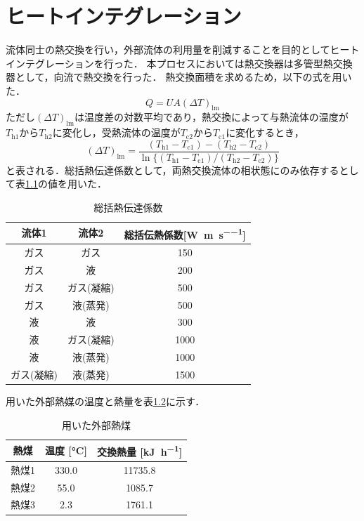 \documentclass[a4j]{jsreport}
\begin{document}
\clearpage
\chapter{ヒートインテグレーション}
流体同士の熱交換を行い，外部流体の利用量を削減することを目的としてヒートインテグレーションを行った．
本プロセスにおいては熱交換器は多管型熱交換器として，向流で熱交換を行った．
熱交換面積を求めるため，以下の式を用いた．
\begin{equation}
    Q=UA(\varDelta T)_\mathrm{lm}
\end{equation}
ただし$(\varDelta T)_\mathrm{lm}$は温度差の対数平均であり，熱交換によって与熱流体の温度が$T_\mathrm{h1}$から$T_\mathrm{h2}$に変化し，受熱流体の温度が$T_\mathrm{c2}$から$T_\mathrm{c1}$に変化するとき，
\begin{equation}
    (\varDelta T)_\mathrm{lm} = \frac{(T_\mathrm{h1} - T_\mathrm{c1}) - (T_\mathrm{h2} - T_\mathrm{c2})}{\ln\{(T_\mathrm{h1} - T_\mathrm{c1}) / (T_\mathrm{h2} - T_\mathrm{c2})\}}
\end{equation}
と表される．総括熱伝達係数として，両熱交換流体の相状態にのみ依存するとして表\ref{総括熱伝達係数}の値を用いた．
\begin{table}[htbp]
  \centering
  \caption{総括熱伝達係数}
  \label{総括熱伝達係数}
  \begin{tabular}{ccc}
    \hline
    流体1 & 流体2 & 総括伝熱係数[\si{\watt \per \metre \per \second}] \\
    \hline
    ガス & ガス &150 \\
    ガス & 液 &200 \\
    ガス & ガス(凝縮) & 500 \\
    ガス & 液(蒸発) & 500 \\
    液 & 液 & 300 \\
    液 & ガス(凝縮) & 1000 \\
    液 & 液(蒸発) & 1000 \\
    ガス(凝縮) & 液(蒸発) &1500 \\
    \hline
  \end{tabular}
\end{table}

用いた外部熱媒の温度と熱量を表\ref{用いた外部熱煤}に示す．
\begin{table}
  \centering
  \caption{用いた外部熱煤}
  \label{用いた外部熱煤}
  \begin{tabular}{ccc}
    \hline
    熱煤 & 温度 [\si{\degreeCelsius}] & 交換熱量 [\si{\kilo \joule \per \hour}] \\
    \hline
    熱煤1 & 330.0 & 11735.8 \\
    熱煤2 & 55.0 & 1085.7 \\
    熱煤3 & 2.3 & 1761.1 \\
    \hline
  \end{tabular}
\end{table}
\end{document}
